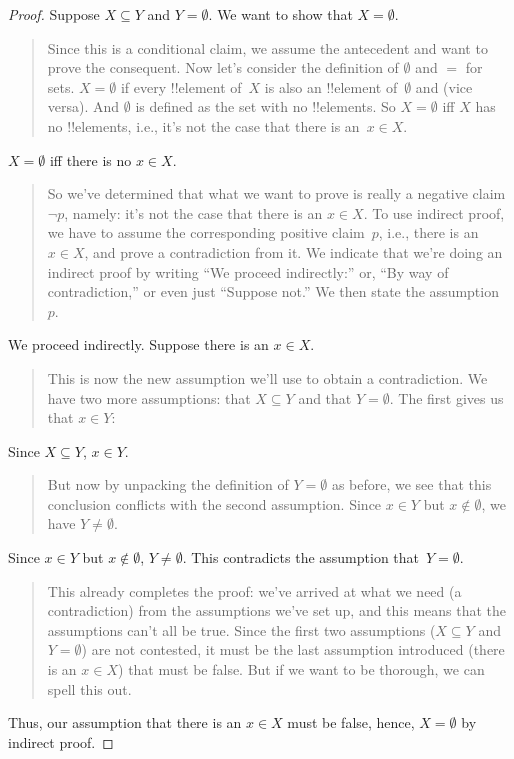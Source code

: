 \documentclass[../../../include/open-logic-section]{subfiles}
\begin{document}
\begin{proof}
  Suppose $X \subseteq Y$ and $Y = \emptyset$. We want to show that $X
  = \emptyset$.
  \begin{quote}
    Since this is a conditional claim, we assume the antecedent and
    want to prove the consequent.  Now let's consider the definition
    of $\emptyset$ and $=$ for sets. $X = \emptyset$ if every
    !!{element} of~$X$ is also an !!{element} of~$\emptyset$ and (vice
    versa). And $\emptyset$ is defined as the set with no
    !!{element}s. So $X = \emptyset$ iff $X$ has no !!{element}s,
    i.e., it's not the case that there is an~$x \in X$.
  \end{quote}
  $X = \emptyset$ iff there is no $x \in X$.
  \begin{quote}
    So we've determined that what we want to prove is really a
    negative claim $\lnot p$, namely: it's not the case that there is
    an $x \in X$.  To use indirect proof, we have to assume the
    corresponding positive claim~$p$, i.e., there is an $x \in X$, and
    prove a contradiction from it.  We indicate that we're doing an
    indirect proof by writing ``We proceed indirectly:'' or, ``By way
    of contradiction,'' or even just ``Suppose not.'' We then state
    the assumption~$p$.
  \end{quote}
  We proceed indirectly. Suppose there is an $x \in X$.
  \begin{quote}
    This is now the new assumption we'll use to obtain a
    contradiction. We have two more assumptions: that $X \subseteq Y$
    and that $Y = \emptyset$. The first gives us that $x \in Y$:
  \end{quote}
  Since $X \subseteq Y$, $x \in Y$.
  \begin{quote}
    But now by unpacking the definition of $Y = \emptyset$ as before,
    we see that this conclusion conflicts with the second
    assumption. Since $x \in Y$ but $x \notin \emptyset$, we have $Y
    \neq \emptyset$.
  \end{quote}
  Since $x \in Y$ but $x \notin \emptyset$, $Y \neq \emptyset$. This
  contradicts the assumption that~$Y = \emptyset$.
  \begin{quote}
    This already completes the proof: we've arrived at what we need (a
    contradiction) from the assumptions we've set up, and this means
    that the assumptions can't all be true. Since the first two
    assumptions ($X \subseteq Y$ and $Y = \emptyset$) are not
    contested, it must be the last assumption introduced (there is an
    $x \in X$) that must be false. But if we want to be thorough, we
    can spell this out.
  \end{quote}
  Thus, our assumption that there is an $x \in X$ must be false, hence,
  $X = \emptyset$ by indirect proof.
\end{proof}
\end{document}
